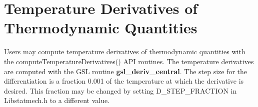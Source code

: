 \documentclass{article}    %
\begin{document}
\section{Temperature Derivatives of Thermodynamic Quantities}

Users may compute temperature derivatives of thermodynamic quantities with
the computeTemperatureDerivatives() API routines.
The temperature derivatives are computed with the GSL routine
{\bf gsl\_deriv\_central}.  The step size for the differentiation is
a fraction 0.001 of the temperature at which the derivative is desired.
This fraction may be changed by setting D\_STEP\_FRACTION in Libstatmech.h
to a different value.
\end{document}
